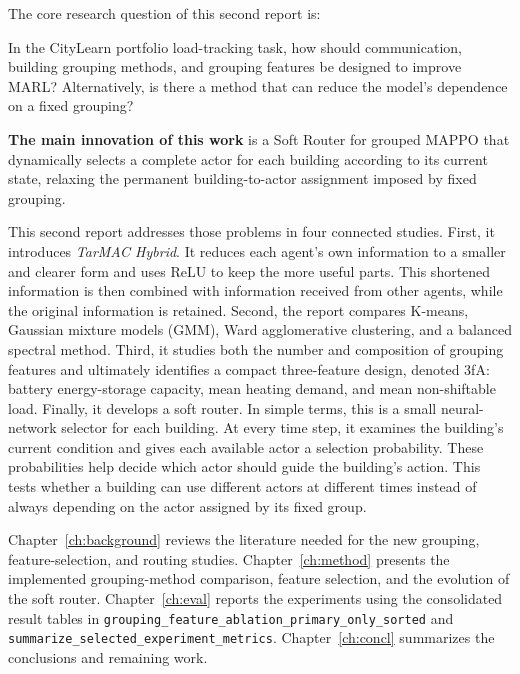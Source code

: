 The core research question of this second report is:

In the CityLearn portfolio load-tracking task, how should communication,
building grouping methods, and grouping features be designed to improve MARL?
Alternatively, is there a method that can reduce the model's dependence on a
fixed grouping?


\noindent\textbf{The main innovation of this work} is a Soft Router for grouped
MAPPO that dynamically selects a complete actor for each building according to
its current state, relaxing the permanent building-to-actor assignment imposed
by fixed grouping.


This second report addresses those problems in four connected studies. First,
it introduces \emph{TarMAC Hybrid}. It reduces each agent's own information to
a smaller and clearer form and uses ReLU to keep the more useful parts. This
shortened information is then combined with information received from other
agents, while the original information is retained. Second, the report compares
K-means, Gaussian mixture models (GMM), Ward agglomerative clustering, and a
balanced spectral method. Third, it studies both the number and composition of
grouping features and ultimately identifies a compact three-feature design,
denoted 3fA:
battery energy-storage capacity, mean heating demand, and mean non-shiftable
load. Finally, it develops a soft router. In simple terms, this is a small
neural-network selector for each building. At every time step, it examines the
building's current condition and gives each available actor a selection
probability. These probabilities help decide which actor should guide the
building's action. This tests whether a building can use different actors at
different times instead of always depending on the actor assigned by its fixed
group.


Chapter~\ref{ch:background} reviews the literature needed for the new grouping,
feature-selection, and routing studies. Chapter~\ref{ch:method} presents the
implemented grouping-method comparison, feature selection, and the evolution
of the soft router.
Chapter~\ref{ch:eval} reports the experiments using the consolidated result
tables in \texttt{grouping\_feature\_ablation\_primary\_only\_sorted} and
\texttt{summarize\_selected\_experiment\_metrics}. Chapter~\ref{ch:concl}
summarizes the conclusions and remaining work.

